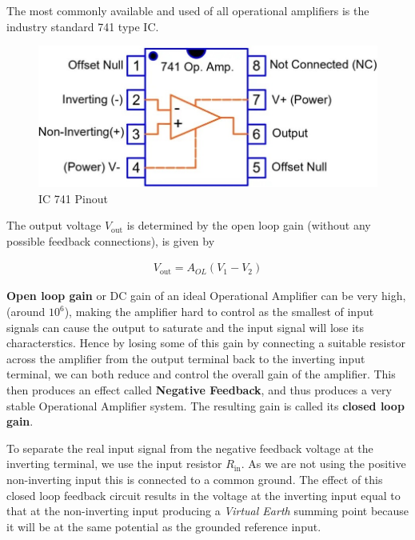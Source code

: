 The most commonly available and used of all operational amplifiers is the industry standard 741 type IC. 

\begin{figure}[H]
    \centering
    \includegraphics[width=0.95\columnwidth]{images/pinout.jpeg}
    \caption{IC 741 Pinout}
    \label{fig:1}
\end{figure}

The output voltage $V_\text{out}$ is determined by the open loop gain (without any possible feedback connections), is given by 

\begin{align}V_\text{out}=A_{OL}(V_1-V_2)\end{align} 

\textbf{Open loop gain} or DC gain of an ideal Operational Amplifier can be very high, (around $10^6$), making the amplifier hard to control as the smallest of input signals can cause the output to saturate and the input signal will lose its characterstics. Hence by losing some of this gain by connecting a suitable resistor across the amplifier from the output terminal back to the inverting input terminal, we can both reduce and control the overall gain of the amplifier. This then produces an effect called \textbf{Negative Feedback}, and thus produces a very stable Operational Amplifier system. The resulting gain is called its \textbf{closed loop gain}.



To separate the real input signal from the negative feedback voltage at the inverting terminal, we use the input resistor $R_\text{in}$. As we are not using the positive non-inverting input this is connected to a common ground.
The effect of this closed loop feedback circuit results in the voltage at the inverting input equal to that at the non-inverting input producing a \textit{Virtual Earth} summing point because it will be at the same potential as the grounded reference input. 

